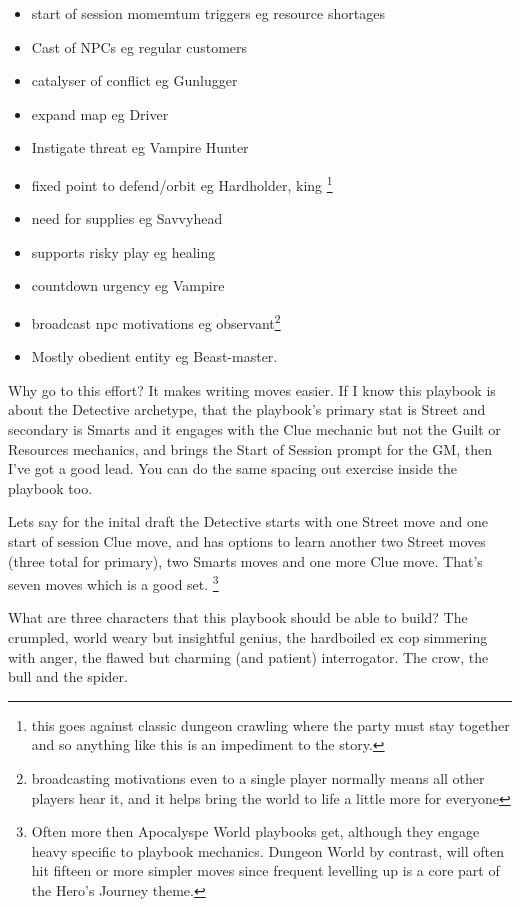 \documentclass{tufte-handout}
\begin{document}
\begin{itemize}
\item start of session momemtum triggers eg resource shortages
\item Cast of NPCs  eg regular customers
\item catalyser of conflict eg Gunlugger
\item expand map eg Driver
\item Instigate threat eg Vampire Hunter
\item fixed point to defend/orbit eg Hardholder, king \footnote{this goes against classic dungeon crawling where the party must stay together and so anything like this is an impediment to the story.}
\item need for supplies eg Savvyhead
\item supports risky play eg healing
\item countdown urgency eg Vampire
\item broadcast npc motivations eg observant\footnote{broadcasting motivations even to a single player normally means all other players hear it, and it helps bring the world to life a little more for everyone}
\item Mostly obedient entity eg Beast-master.
\end{itemize}

Why go to this effort? It makes writing moves easier. If I know this playbook is about the Detective archetype, that the playbook's primary stat is Street and secondary is Smarts and it engages with the Clue mechanic but not the Guilt or Resources mechanics, and brings the Start of Session prompt for the GM, then I've got a good lead. You can do the same spacing out exercise inside the playbook too. 

Lets say for the inital draft the Detective starts with one Street move and one start of session Clue move, and has options to learn another two Street moves (three total for primary), two Smarts moves and one more Clue move. That's seven moves which is a good set. \footnote{ Often more then Apocalyspe World playbooks get, although they engage heavy specific to playbook mechanics. Dungeon World by contrast, will often hit fifteen or more simpler moves since frequent levelling up is a core part of the Hero's Journey theme.}

What are three characters that this playbook should be able to build? The crumpled, world weary but insightful genius, the hardboiled ex cop simmering with anger, the flawed but charming (and patient) interrogator. The crow, the bull and the spider.
\end{document}
